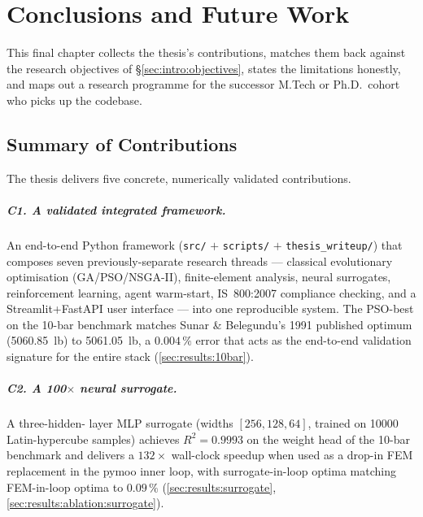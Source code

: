 \chapter{Conclusions and Future Work}
\label{chap:conclusion}

This final chapter collects the thesis's contributions, matches
them back against the research objectives of
\S\ref{sec:intro:objectives}, states the limitations honestly,
and maps out a research programme for the successor M.Tech or
Ph.D.\ cohort who picks up the codebase.

\section{Summary of Contributions}
\label{sec:concl:summary}

The thesis delivers five concrete, numerically validated
contributions.

\paragraph{C1. A validated integrated framework.} An end-to-end
Python framework (\texttt{src/} $+$ \texttt{scripts/} $+$
\texttt{thesis\_writeup/}) that composes seven previously-separate
research threads --- classical evolutionary optimisation
(GA/PSO/NSGA-II), finite-element analysis, neural surrogates,
reinforcement learning, agent warm-start, IS~800:2007 compliance
checking, and a Streamlit+FastAPI user interface --- into one
reproducible system. The PSO-best on the 10-bar benchmark
matches Sunar \& Belegundu's 1991 published optimum
(\num{5060.85}~lb) to \num{5061.05}~lb, a $\num{0.004}\,\%$
error that acts as the end-to-end validation signature for the
entire stack
(\cref{sec:results:10bar}).

\paragraph{C2. A 100$\times$ neural surrogate.} A three-hidden-
layer MLP surrogate (widths $[\num{256},\num{128},\num{64}]$,
trained on \num{10000} Latin-hypercube samples)
achieves $R^2=\num{0.9993}$ on the weight head of the 10-bar
benchmark and delivers a $\num{132}\times$ wall-clock speedup
when used as a drop-in FEM replacement in the pymoo inner loop,
with surrogate-in-loop optima matching FEM-in-loop optima to
$\num{0.09}\,\%$
(\cref{sec:results:surrogate},
\cref{sec:results:ablation:surrogate}).


